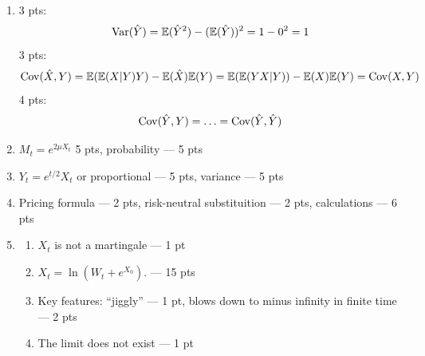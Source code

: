 \documentclass[pdftex,12pt,a4paper]{article}
\begin{document}
\begin{enumerate}
\item 3 pts:
\[
\operatorname{Var}(\hat{Y})=\mathbb{E}(\hat{Y}^2)-(\mathbb{E}(\hat{Y}))^2=1-0^2=1
\]
3 pts: 
\[
\operatorname{Cov}(\hat{X},Y)=\mathbb{E}(\mathbb{E}(X|Y)Y)-\mathbb{E}(\hat{X})\mathbb{E}(Y)=\mathbb{E}(\mathbb{E}(YX|Y))-\mathbb{E}(X)\mathbb{E}(Y)=\operatorname{Cov}(X,Y)
\]
4 pts:
\[
\operatorname{Cov}(\hat{Y},Y)=\ldots=\operatorname{Cov}(\hat{Y},\hat{Y})
\]

\item $M_t=e^{2\mu X_t}$ 5 pts, probability --- 5 pts

\item $Y_t=e^{t/2}X_t$ or proportional --- 5 pts, variance --- 5 pts

\item Pricing formula --- 2 pts, risk-neutral substituition --- 2 pts, calculations --- 6 pts

\item
\begin{enumerate}
\item  $X_t$ is not a martingale --- 1 pt
\item $X_t=\ln(W_t+e^{X_0})$. --- 15 pts
\item Key features: ``jiggly'' ---  1 pt, blows down to minus infinity in finite time --- 2 pts 
\item The limit does not exist --- 1 pt
\end{enumerate}

\end{enumerate}
\end{document}
